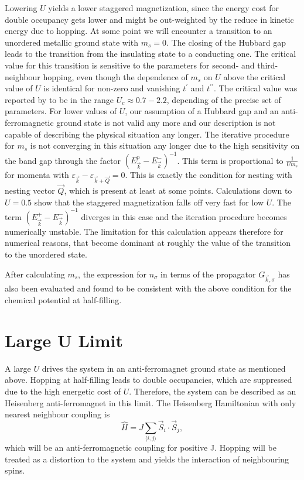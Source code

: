 \documentclass[a4paper,12pt]{report}
\begin{document}
Lowering $U$ yields a lower staggered magnetization, since the energy cost for double occupancy gets lower and might be out-weighted by
the reduce in kinetic energy due to hopping.
%
At some point we will encounter a transition to an unordered metallic ground state with $m_s=0$. 
The closing of the Hubbard gap leads to the transition from the insulating state to a conducting one.
The critical value for this transition is sensitive to the parameters for second- and third-neighbour hopping, 
even though the dependence of $m_s$ on $U$ above the critical value of $U$ is identical for non-zero and vanishing $t^{\prime}$ and $t^{\prime \prime}$.
The critical value was reported by \citet{PhysRevB.88.035111} to be in the range $U_c \approx 0.7 - 2.2$, depending of the precise set of parameters.
For lower values of $U$, our assumption of a Hubbard gap and an anti-ferromagnetic ground state is not valid any more
and our description is not capable of describing the physical situation any longer. 
The iterative procedure for $m_s$ is not converging in this situation any longer due to the high sensitivity on the band gap through the factor $(E^p_{\vec k} - E^-_{\vec k})^{-1}$.
This term is proportional to $\frac{1}{Um_s}$ for momenta with $\varepsilon_{\vec k} - \varepsilon_{\vec k+\vec Q} =0$.
This is exactly the condition for nesting with nesting vector $\vec Q$, which is present at least at some points.
Calculations down to $U=0.5$ show that the staggered magnetization falls off very fast for low $U$. 
The term $(E^+_{\vec k} -E^-_{\vec k})^{-1}$ diverges in this case and the iteration procedure becomes numerically unstable. 
The limitation for this calculation appears therefore for numerical reasons, that become dominant at roughly the value of the transition to the unordered state.

After calculating $m_{s}$, the expression for $n_{\sigma}$ in terms of the propagator $G_{\vec k,\sigma}$ has also been evaluated 
and found to be consistent with the above condition for the chemical potential at half-filling.



\section{Large U Limit}

A large $U$ drives the system in an anti-ferromagnet ground state as mentioned above. 
Hopping at half-filling leads to double occupancies, which are suppressed due to the high energetic cost of $U$. 
Therefore, the system can be described as an Heisenberg anti-ferromagnet in this limit.
The Heisenberg Hamiltonian with only nearest neighbour coupling is
\begin{equation}
 \hat H = J \sum_{\langle i,j\rangle} \vec{S}_i \cdot \vec{S}_j,
\end{equation}
which will be an anti-ferromagnetic coupling for positive J. 
Hopping will be treated as a distortion to the system and yields the interaction of neighbouring spins.
\end{document}
